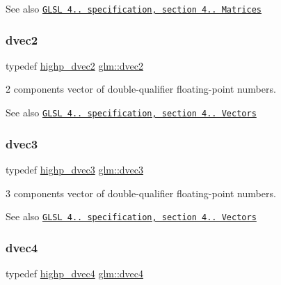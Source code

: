 \begin{DoxySeeAlso}{See also}
\href{http://www.opengl.org/registry/doc/GLSLangSpec.4.20.8.pdf}{\tt G\+L\+SL 4.. specification, section 4.. Matrices} 
\end{DoxySeeAlso}
\mbox{\label{group__core__types_gae6727259898288cae197724d5f172b3b}} 
\subsubsection{\texorpdfstring{dvec2}{dvec2}}
{\footnotesize\ttfamily typedef \hyperlink{group__core__precision_gadec51e8e57b72d8fc95e87f18d1ad4dd}{highp\+\_\+dvec2} \hyperlink{group__core__types_gae6727259898288cae197724d5f172b3b}{glm\+::dvec2}}

2 components vector of double-\/qualifier floating-\/point numbers.

\begin{DoxySeeAlso}{See also}
\href{http://www.opengl.org/registry/doc/GLSLangSpec.4.20.8.pdf}{\tt G\+L\+SL 4.. specification, section 4.. Vectors} 
\end{DoxySeeAlso}
\mbox{\label{group__core__types_ga7f3287f952e6ccb481231368091702ac}} 
\subsubsection{\texorpdfstring{dvec3}{dvec3}}
{\footnotesize\ttfamily typedef \hyperlink{group__core__precision_ga63f89fa26f599ac15428c9d1a70a5467}{highp\+\_\+dvec3} \hyperlink{group__core__types_ga7f3287f952e6ccb481231368091702ac}{glm\+::dvec3}}

3 components vector of double-\/qualifier floating-\/point numbers.

\begin{DoxySeeAlso}{See also}
\href{http://www.opengl.org/registry/doc/GLSLangSpec.4.20.8.pdf}{\tt G\+L\+SL 4.. specification, section 4.. Vectors} 
\end{DoxySeeAlso}
\mbox{\label{group__core__types_ga0824ceed7ec3b2fba89765501c1540b5}} 
\subsubsection{\texorpdfstring{dvec4}{dvec4}}
{\footnotesize\ttfamily typedef \hyperlink{group__core__precision_ga6e8645fa38f0260e57f1fb7555de0c2f}{highp\+\_\+dvec4} \hyperlink{group__core__types_ga0824ceed7ec3b2fba89765501c1540b5}{glm\+::dvec4}}

